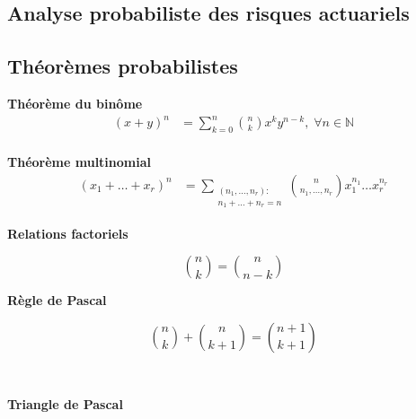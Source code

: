 \documentclass[10pt, french]{article}
\begin{document}
\begin{multicols*}{2}
\newpage

\section*{Analyse probabiliste des risques actuariels}

\subsection*{Théorèmes probabilistes}

\textbf{Théorème du binôme}
\begin{align*}
	(x + y)^{n}
		&=	\sum_{k = 0}^{n} \binom{n}{k} x^{k} y^{n - k}, \; \forall n \in \mathds{N}	\\
\end{align*}

%

\textbf{Théorème multinomial}
\begin{align*}
	(x_1 + \dots + x_r)^{n}
		&=	\sum_{\substack{(n_1, \dots, n_r): \\ n_1 + \dots + n_r = n}} \binom{n}{n_{1}, \dots, n_{r}} x_{1}^{n_{1}} \dots x_{r}^{n_{r}}	
\end{align*}

\begin{minipage}[ht]{0.5\linewidth}
\textbf{Relations factoriels}

\begin{equation*}
	\binom{n}{k}
		=	\binom{n}{n - k}		
\end{equation*}
\end{minipage}
\begin{minipage}[ht]{0.5\linewidth}
\textbf{Règle de Pascal}

\begin{equation*}
	\binom{n}{k} + \binom{n}{k + 1}
		=	\binom{n + 1}{k + 1}		
\end{equation*}
\end{minipage}
\

\textbf{Triangle de Pascal}

\begin{minipage}{0.4\linewidth}


\end{minipage}
\end{multicols*}
\end{document}
